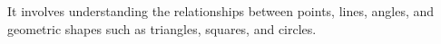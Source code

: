 \documentclass[preview]{standalone}
\begin{document}
\begin{center}
It involves understanding the relationships between points, lines, angles, and geometric shapes such as triangles, squares, and circles.
\end{center}
\end{document}
